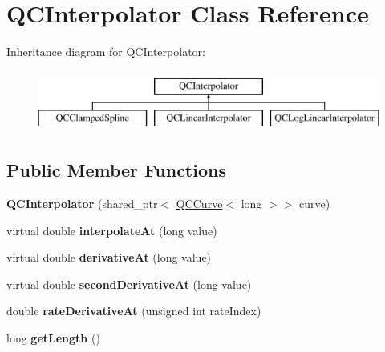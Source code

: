 \hypertarget{class_q_c_interpolator}{\section{Q\+C\+Interpolator Class Reference}
\label{class_q_c_interpolator}
}
Inheritance diagram for Q\+C\+Interpolator\+:\begin{figure}[H]
\begin{center}
\leavevmode
\includegraphics[height=2.000000cm]{class_q_c_interpolator}
\end{center}
\end{figure}
\subsection*{Public Member Functions}
\begin{DoxyCompactItemize}
\item 
\hypertarget{class_q_c_interpolator_a403ed055096d89353b00a6ab32a18f05}{{\bfseries Q\+C\+Interpolator} (shared\+\_\+ptr$<$ \hyperlink{class_q_c_curve}{Q\+C\+Curve}$<$ long $>$$>$ curve)}\label{class_q_c_interpolator_a403ed055096d89353b00a6ab32a18f05}

\item 
\hypertarget{class_q_c_interpolator_a79b39c3c85d42d87faa938a3dc55b37d}{virtual double {\bfseries interpolate\+At} (long value)}\label{class_q_c_interpolator_a79b39c3c85d42d87faa938a3dc55b37d}

\item 
\hypertarget{class_q_c_interpolator_a8c00193c882786d6592979c87aaf1d15}{virtual double {\bfseries derivative\+At} (long value)}\label{class_q_c_interpolator_a8c00193c882786d6592979c87aaf1d15}

\item 
\hypertarget{class_q_c_interpolator_a9b258b5354f6dac04ce65a1f97874261}{virtual double {\bfseries second\+Derivative\+At} (long value)}\label{class_q_c_interpolator_a9b258b5354f6dac04ce65a1f97874261}

\item 
\hypertarget{class_q_c_interpolator_afc9bf8b0d87050efca3a6633c121580f}{double {\bfseries rate\+Derivative\+At} (unsigned int rate\+Index)}\label{class_q_c_interpolator_afc9bf8b0d87050efca3a6633c121580f}

\item 
\hypertarget{class_q_c_interpolator_a0830d56af8995cdb04a437b0e36fa44a}{long {\bfseries get\+Length} ()}\label{class_q_c_interpolator_a0830d56af8995cdb04a437b0e36fa44a}

\end{DoxyCompactItemize}
